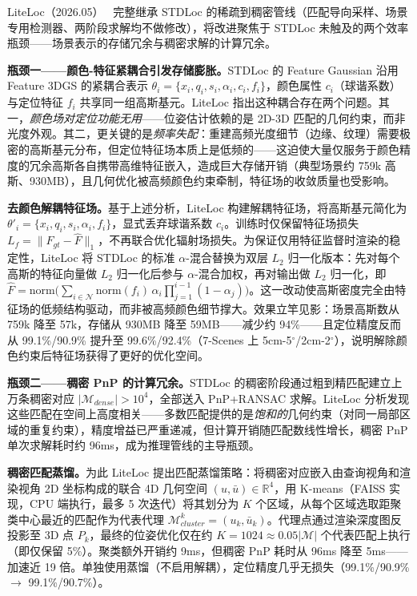LiteLoc（2026.05）~\cite{2605_17777} 完整继承 STDLoc 的稀疏到稠密管线（匹配导向采样、场景专用检测器、两阶段求解均不做修改），将改进聚焦于 STDLoc 未触及的两个效率瓶颈——场景表示的存储冗余与稠密求解的计算冗余。

\textbf{瓶颈一——颜色-特征紧耦合引发存储膨胀。}STDLoc 的 Feature Gaussian 沿用 Feature 3DGS 的紧耦合表示 $\theta_i = \{x_i, q_i, s_i, \alpha_i, c_i, f_i\}$，颜色属性 $c_i$（球谐系数）与定位特征 $f_i$ 共享同一组高斯基元。LiteLoc 指出这种耦合存在两个问题。其一，\emph{颜色场对定位功能无用}——位姿估计依赖的是 2D-3D 匹配的几何约束，而非光度外观。其二，更关键的是\emph{频率失配}：重建高频光度细节（边缘、纹理）需要极密的高斯基元分布，但定位特征场本质上是低频的——这迫使大量仅服务于颜色精度的冗余高斯各自携带高维特征嵌入，造成巨大存储开销（典型场景约 759k 高斯、930MB），且几何优化被高频颜色约束牵制，特征场的收敛质量也受影响。

\textbf{去颜色解耦特征场。}基于上述分析，LiteLoc 构建解耦特征场，将高斯基元简化为 $\theta'_i = \{x_i, q_i, s_i, \alpha_i, f_i\}$，显式丢弃球谐系数 $c_i$。训练时仅保留特征场损失 $L_f = \|F_{gt} - \hat{F}\|_1$，不再联合优化辐射场损失。为保证仅用特征监督时渲染的稳定性，LiteLoc 将 STDLoc 的标准 $\alpha$-混合替换为双层 $L_2$ 归一化版本：先对每个高斯的特征向量做 $L_2$ 归一化后参与 $\alpha$-混合加权，再对输出做 $L_2$ 归一化，即 $\hat{F} = \text{norm}\bigl(\sum_{i \in \mathcal{N}} \text{norm}(f_i)\,\alpha_i \prod_{j=1}^{i-1}(1-\alpha_j)\bigr)$。这一改动使高斯密度完全由特征场的低频结构驱动，而非被高频颜色细节撑大。效果立竿见影：场景高斯数从 759k 降至 57k，存储从 930MB 降至 59MB——减少约 94\%——且定位精度反而从 99.1\%/90.9\% 提升至 99.6\%/92.4\%（7-Scenes 上 5cm-5$^\circ$/2cm-2$^\circ$），说明解除颜色约束后特征场获得了更好的优化空间。

\textbf{瓶颈二——稠密 PnP 的计算冗余。}STDLoc 的稠密阶段通过粗到精匹配建立上万条稠密对应 $|\mathcal{M}_{dense}| > 10^4$，全部送入 PnP+RANSAC 求解。LiteLoc 分析发现这些匹配在空间上高度相关——多数匹配提供的是\emph{饱和的}几何约束（对同一局部区域的重复约束），精度增益已严重递减，但计算开销随匹配数线性增长，稠密 PnP 单次求解耗时约 96ms，成为推理管线的主导瓶颈。

\textbf{稠密匹配蒸馏。}为此 LiteLoc 提出匹配蒸馏策略：将稠密对应嵌入由查询视角和渲染视角 2D 坐标构成的联合 4D 几何空间 $(u, \bar{u}) \in \mathbb{R}^4$，用 K-means（FAISS 实现，CPU 端执行，最多 5 次迭代）将其划分为 $K$ 个区域，从每个区域选取距聚类中心最近的匹配作为代表代理 $\mathcal{M}_{cluster}^k = (u_k, \bar{u}_k)$。代理点通过渲染深度图反投影至 3D 点 $P_k$，最终的位姿优化仅在约 $K = 1024 \approx 0.05|\mathcal{M}|$ 个代表匹配上执行（即仅保留 5\%）。聚类额外开销约 9ms，但稠密 PnP 耗时从 96ms 降至 5ms——加速近 19 倍。单独使用蒸馏（不启用解耦），定位精度几乎无损失（99.1\%/90.9\% $\to$ 99.1\%/90.7\%）。

